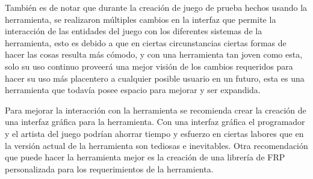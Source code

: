 También es de notar que durante la creación de juego de prueba hechos usando la herramienta, se realizaron múltiples cambios en la interfaz que permite la interacción de las entidades del juego con los diferentes sistemas de la herramienta, esto es debido a que en ciertas circunstancias ciertas formas de hacer las cosas resulta más cómodo, y con una herramienta tan joven como esta, solo su uso continuo proveerá una mejor visión de los cambios requeridos para hacer su uso más placentero a cualquier posible usuario en un futuro, esta es una herramienta que todavía posee espacio para mejorar y ser expandida.

Para mejorar la interacción con la herramienta se recomienda crear la creación de una interfaz gráfica para la herramienta. Con una interfaz gráfica el programador y el artista del juego podrían ahorrar tiempo y esfuerzo en ciertas labores que en la versión actual de la herramienta son tediosas e inevitables. Otra recomendación que puede hacer la herramienta mejor es la creación de una librería de FRP personalizada para los requerimientos de la herramienta.
